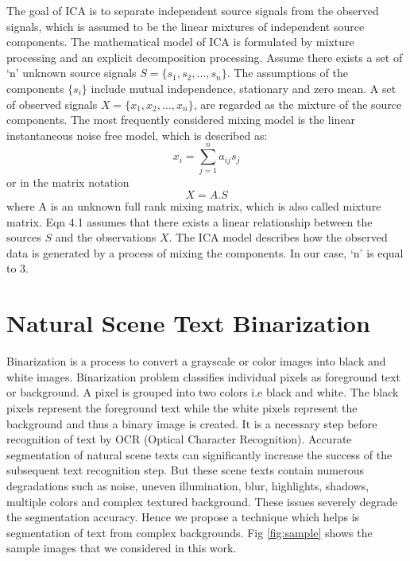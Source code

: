 The goal of ICA is to separate independent 
source signals from the observed signals, which is assumed 
to be the linear mixtures of independent source components. 
The mathematical model of ICA is formulated by 
mixture processing and an explicit decomposition processing.  
Assume there exists a set of `n' unknown source signals 
$S=\{s_1, s_2,..., s_n \}$. The assumptions of the components 
$\{s_i\}$  include mutual independence, stationary and zero mean. 
A set of observed signals $X=\{x_1,x_2,...,x_n\}$, are regarded as the mixture of the source 
components. The most frequently considered 
mixing model is the linear instantaneous noise free model,
which is described as: 
\begin{equation}
x_i=\sum_{j=1}^{n}a_{ij}s_j 
\end{equation}or in the matrix notation
\begin{equation}
X=A.S  
\end{equation}where A is an unknown full rank mixing matrix, which is 
also called mixture matrix. Eqn 4.1 assumes that there exists a 
linear relationship between the sources $S$ and the observations 
$X$. The ICA model describes how the observed data is 
generated by a process of mixing the components. In our case, `n' is equal to 3. 


\section{Natural Scene Text Binarization}
Binarization is a process to convert a grayscale or color 
images into black and white images. Binarization 
problem classifies individual pixels as foreground text or 
background. A pixel is grouped into two colors i.e black and white. The black pixels represent the 
foreground text while the white pixels represent the background and thus a binary image is created.
It is a necessary step before recognition of text by OCR (Optical Character Recognition). 
Accurate segmentation of natural scene texts can significantly increase the success of
the subsequent text recognition step. 
But these scene texts contain numerous degradations 
such as noise, uneven
illumination, blur, highlights, shadows,  multiple colors and complex textured background.
These issues severely degrade the segmentation accuracy. Hence we propose a technique which helps is 
segmentation of text from complex backgrounds.
Fig \ref{fig:sample} shows the sample images that we considered in this work.


